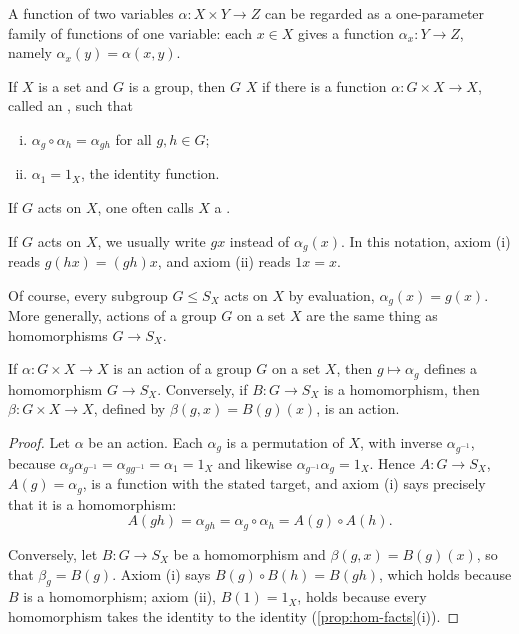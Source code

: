 \begin{notation}
	A function of two variables \(\alpha\colon X \times Y \to Z\) can be regarded as a
	one-parameter family of functions of one variable: each \(x \in X\) gives a function
	\(\alpha_x\colon Y \to Z\), namely \(\alpha_x(y) = \alpha(x,y)\).
\end{notation}

\begin{definition}\label{def:action}
	If \(X\) is a set and \(G\) is a group, then \(G\)  \(X\) if there is a
	function \(\alpha\colon G \times X \to X\), called an , such that
	\begin{enumerate}[(i)]
		\item \(\alpha_g \circ \alpha_h = \alpha_{gh}\) for all \(g, h \in G\);
		\item \(\alpha_1 = 1_X\), the identity function.
	\end{enumerate}
	If \(G\) acts on \(X\), one often calls \(X\) a .
\end{definition}

\begin{notation}
	If \(G\) acts on \(X\), we usually write \(gx\) instead of \(\alpha_g(x)\). In this
	notation, axiom (i) reads \(g(hx) = (gh)x\), and axiom (ii) reads \(1x = x\).
\end{notation}

Of course, every subgroup \(G \leq S_X\) acts on \(X\) by evaluation,
\(\alpha_g(x) = g(x)\). More generally, actions of a group \(G\) on a set \(X\) are the
same thing as homomorphisms \(G \to S_X\).

\begin{proposition}\label{prop:action-hom}
	If \(\alpha\colon G \times X \to X\) is an action of a group \(G\) on a set \(X\), then
	\(g \mapsto \alpha_g\) defines a homomorphism \(G \to S_X\). Conversely, if
	\(B\colon G \to S_X\) is a homomorphism, then \(\beta\colon G \times X \to X\), defined
	by \(\beta(g,x) = B(g)(x)\), is an action.
\end{proposition}

\begin{proof}
	Let \(\alpha\) be an action. Each \(\alpha_g\) is a permutation of \(X\), with inverse
	\(\alpha_{g^{-1}}\), because
	\(\alpha_g\alpha_{g^{-1}} = \alpha_{gg^{-1}} = \alpha_1 = 1_X\) and likewise
	\(\alpha_{g^{-1}}\alpha_g = 1_X\). Hence \(A\colon G \to S_X\), \(A(g) = \alpha_g\), is
	a function with the stated target, and axiom (i) says precisely that it is a
	homomorphism:
	\[
		A(gh) = \alpha_{gh} = \alpha_g \circ \alpha_h = A(g) \circ A(h).
	\]

	Conversely, let \(B\colon G \to S_X\) be a homomorphism and
	\(\beta(g,x) = B(g)(x)\), so that \(\beta_g = B(g)\). Axiom (i) says
	\(B(g) \circ B(h) = B(gh)\), which holds because \(B\) is a homomorphism; axiom (ii),
	\(B(1) = 1_X\), holds because every homomorphism takes the identity to the identity
	(\autoref{prop:hom-facts}(i)).
\end{proof}

